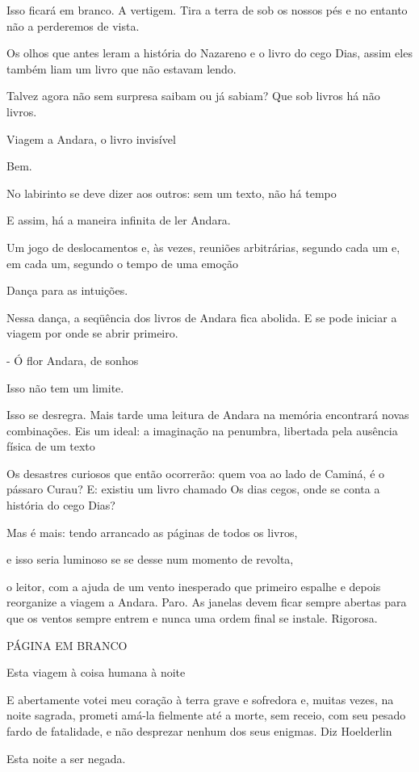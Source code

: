 Isso ficará em branco. A vertigem. Tira a terra de sob os nossos pés e
no entanto não a perderemos de vista.

Os olhos que antes leram a história do Nazareno e o livro do cego Dias,
assim eles também liam um livro que não estavam lendo.

Talvez agora não sem surpresa saibam ou já sabiam? Que sob livros há não
livros.

Viagem a Andara, o livro invisível

Bem.

No labirinto se deve dizer aos outros: sem um texto, não há tempo

E assim, há a maneira infinita de ler Andara.

Um jogo de deslocamentos e, às vezes, reuniões arbitrárias, segundo cada
um e, em cada um, segundo o tempo de uma emoção

Dança para as intuições.

Nessa dança, a seqüência dos livros de Andara fica abolida. E se pode
iniciar a viagem por onde se abrir primeiro.

- Ó flor Andara, de sonhos

Isso não tem um limite.

Isso se desregra. Mais tarde uma leitura de Andara na memória encontrará
novas combinações. Eis um ideal: a imaginação na penumbra, libertada
pela ausência física de um texto

Os desastres curiosos que então ocorrerão: quem voa ao lado de Caminá, é
o pássaro Curau? E: existiu um livro chamado Os dias cegos, onde se
conta a história do cego Dias?

Mas é mais: tendo arrancado as páginas de todos os livros,

e isso seria luminoso se se desse num momento de revolta,

o leitor, com a ajuda de um vento inesperado que primeiro espalhe e
depois reorganize a viagem a Andara. Paro. As janelas devem ficar sempre
abertas para que os ventos sempre entrem e nunca uma ordem final se
instale. Rigorosa.

PÁGINA EM BRANCO

Esta viagem à coisa humana à noite

E abertamente votei meu coração à terra grave e sofredora e, muitas
vezes, na noite sagrada, prometi amá-la fielmente até a morte, sem
receio, com seu pesado fardo de fatalidade, e não desprezar nenhum dos
seus enigmas. Diz Hoelderlin

Esta noite a ser negada.

